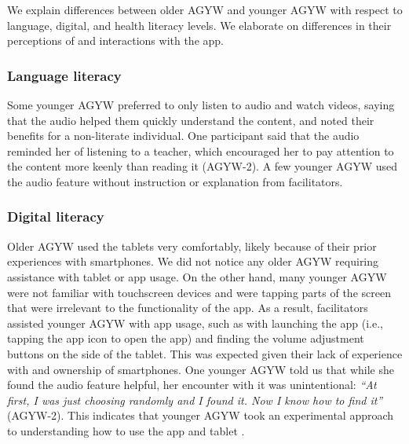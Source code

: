 We explain differences between older AGYW and younger AGYW with respect to language, digital, and health literacy levels. We elaborate on differences in their perceptions of and interactions with the app. 
\subsubsection{Language literacy}

  Some younger AGYW preferred to only listen to audio and watch videos, saying that the audio helped them quickly understand the content, and noted their benefits for a non-literate individual. One participant said that the audio reminded her of listening to a teacher, which encouraged her to pay attention to the content more keenly than reading it (AGYW-2). A few younger AGYW used the audio feature without instruction or explanation from facilitators.

\subsubsection{Digital literacy}

Older AGYW used the tablets very comfortably, likely because of their prior experiences with smartphones. We did not notice any older AGYW requiring assistance with tablet or app usage. On the other hand, many younger AGYW were not familiar with touchscreen devices and were tapping parts of the screen that were irrelevant to the functionality of the app. As a result, facilitators assisted younger AGYW with app usage, such as with launching the app (i.e., tapping the app icon to open the app) and finding the volume adjustment buttons on the side of the tablet. This was expected given their lack of experience with and ownership of smartphones. One younger AGYW told us that while she found the audio feature helpful, her encounter with it was unintentional: \textit{``At first, I was just choosing randomly and I found it. Now I know how to find it”} (AGYW-2). This indicates that younger AGYW took an experimental approach to understanding how to use the app and tablet . 

